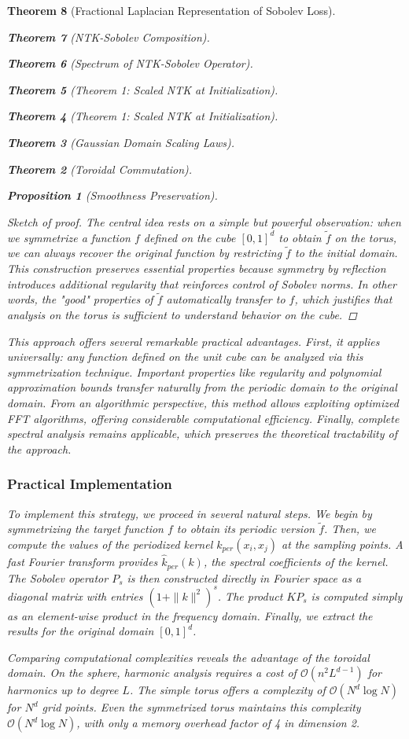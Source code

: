 \documentclass{article}
\newtheorem{theorem}{Theorem}[section]
\newtheorem{proposition}[theorem]{Proposition}
\begin{document}
\begin{theorem}[Fractional Laplacian Representation of Sobolev Loss]
\begin{theorem}[NTK-Sobolev Composition]
\begin{theorem}[Spectrum of NTK-Sobolev Operator]
\begin{theorem}[Theorem 1: Scaled NTK at Initialization]
\begin{theorem}[Theorem 1: Scaled NTK at Initialization]
\begin{theorem}[Gaussian Domain Scaling Laws]
\begin{theorem}[Toroidal Commutation]
\begin{proposition}[Smoothness Preservation]
\begin{proof}[Sketch of proof]
The central idea rests on a simple but powerful observation: when we symmetrize a function $f$ defined on the cube $[0,1]^d$ to obtain $\tilde{f}$ on the torus, we can always recover the original function by restricting $\tilde{f}$ to the initial domain. This construction preserves essential properties because symmetry by reflection introduces additional regularity that reinforces control of Sobolev norms. In other words, the "good" properties of $\tilde{f}$ automatically transfer to $f$, which justifies that analysis on the torus is sufficient to understand behavior on the cube.
\end{proof}

This approach offers several remarkable practical advantages. First, it applies universally: any function defined on the unit cube can be analyzed via this symmetrization technique. Important properties like regularity and polynomial approximation bounds transfer naturally from the periodic domain to the original domain. From an algorithmic perspective, this method allows exploiting optimized FFT algorithms, offering considerable computational efficiency. Finally, complete spectral analysis remains applicable, which preserves the theoretical tractability of the approach.

\subsubsection{Practical Implementation}

To implement this strategy, we proceed in several natural steps. We begin by symmetrizing the target function $f$ to obtain its periodic version $\tilde{f}$. Then, we compute the values of the periodized kernel $k_{per}(x_i, x_j)$ at the sampling points. A fast Fourier transform provides $\hat{k}_{per}(k)$, the spectral coefficients of the kernel. The Sobolev operator $P_s$ is then constructed directly in Fourier space as a diagonal matrix with entries $(1 + \|k\|^2)^s$. The product $KP_s$ is computed simply as an element-wise product in the frequency domain. Finally, we extract the results for the original domain $[0,1]^d$.

Comparing computational complexities reveals the advantage of the toroidal domain. On the sphere, harmonic analysis requires a cost of $\mathcal{O}(n^2 L^{d-1})$ for harmonics up to degree $L$. The simple torus offers a complexity of $\mathcal{O}(N^d \log N)$ for $N^d$ grid points. Even the symmetrized torus maintains this complexity $\mathcal{O}(N^d \log N)$, with only a memory overhead factor of 4 in dimension 2.


\end{proposition}
\end{theorem}
\end{theorem}
\end{theorem}
\end{theorem}
\end{theorem}
\end{theorem}
\end{theorem}
\end{document}

